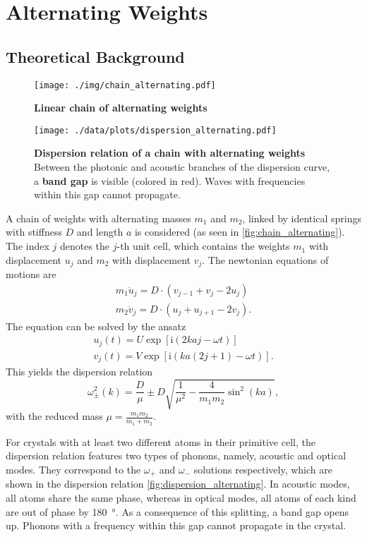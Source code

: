 \section{Alternating Weights} \label{sec:alt_theory}
\subsection{Theoretical Background}
\begin{figure}[tbp]
	\centering
	\texttt{[image: ./img/chain\_alternating.pdf]}
	\caption[Chain of Alternating Weights]{\textbf{Linear chain of alternating weights}}
	\label{fig:chain_alternating}
\end{figure}
\begin{figure}[tbp]
	\centering
	\texttt{[image: ./data/plots/dispersion\_alternating.pdf]}
	\caption[Dispersion Relation of Chain With Alternating Weights]{\textbf{Dispersion relation of a chain with alternating weights} Between the photonic and acoustic branches of the dispersion curve, a \textbf{band gap} is visible (colored in red). Waves with frequencies within this gap cannot propagate.}
	\label{fig:dispersion_alternating}
\end{figure}
A chain of weights with alternating masses $m_1$ and $m_2$, linked by identical springs with stiffness $D$ and length $a$ is considered (as seen in \autoref{fig:chain_alternating}).
The index $j$ denotes the $j$-th unit cell, which contains the weights $m_1$ with displacement $u_j$ and $m_2$ with displacement $v_j$.
The newtonian equations of motions are
\begin{gather*}
	m_1 \ddot u_j = D \cdot \left(v_{j - 1} + v_{j} - 2 u_j \right)\\
	m_2 \ddot v_j = D \cdot \left(u_{j} + u_{j + 1} - 2 v_j \right).
\end{gather*}
The equation can be solved by the ansatz
\begin{gather*}
	u_j(t) = U \exp\left[\text{i} \left(2 k a j - \omega t\right)\right]\\
	v_j(t) = V \exp\left[\text{i} \left(k a (2 j + 1) - \omega t\right)\right].
\end{gather*}
This yields the dispersion relation
\begin{equation}
	\omega_\pm^2(k) = \frac{D}{\mu} \pm D\sqrt{\frac{1}{\mu^2} - \frac{4}{m_1 m_2}\sin^2\left(k a\right)},
\end{equation}
with the reduced mass $\mu = \frac{m_1 m_2}{m_1 + m_2}$.

For crystals with at least two different atoms in their primitive cell, the dispersion relation features two types of phonons, namely, acoustic and optical modes.
They correspond to the $\omega_{+}$ and $\omega_{-}$ solutions respectively, which are shown in the dispersion relation \autoref{fig:dispersion_alternating}.
In acoustic modes, all atoms share the same phase, whereas in optical modes, all atoms of each kind are out of phase by \SI{180}{\degree}.
As a consequence of this splitting, a band gap opens up.
Phonons with a frequency within this gap cannot propagate in the crystal.

